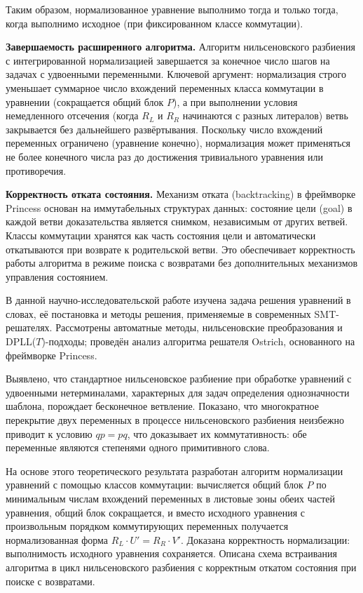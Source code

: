 \documentclass[14pt, russian]{scrartcl}
\begin{document}
Таким образом, нормализованное уравнение выполнимо тогда и только тогда, когда
выполнимо исходное (при фиксированном классе коммутации).

\medskip\noindent\textbf{Завершаемость расширенного алгоритма.}
Алгоритм нильсеновского разбиения с интегрированной нормализацией завершается
за конечное число шагов на задачах с удвоенными переменными. Ключевой аргумент:
нормализация строго уменьшает суммарное число вхождений переменных класса
коммутации в уравнении (сокращается общий блок $P$), а при выполнении условия
немедленного отсечения (когда $R_L$ и $R_R$ начинаются с разных литералов)
ветвь закрывается без дальнейшего развёртывания. Поскольку число вхождений
переменных ограничено (уравнение конечно), нормализация может применяться
не более конечного числа раз до достижения тривиального уравнения или
противоречия.

\medskip\noindent\textbf{Корректность отката состояния.}
Механизм отката (backtracking) в фреймворке Princess основан на иммутабельных
структурах данных: состояние цели (goal) в каждой ветви доказательства
является снимком, независимым от других ветвей. Классы коммутации хранятся
как часть состояния цели и автоматически откатываются при возврате к родительской
ветви. Это обеспечивает корректность работы алгоритма в режиме поиска с
возвратами без дополнительных механизмов управления состоянием.


В данной научно-исследовательской работе изучена задача решения уравнений
в словах, её постановка и методы решения, применяемые в современных SMT-решателях.
Рассмотрены автоматные методы, нильсеновские преобразования и DPLL($T$)-подходы;
проведён анализ алгоритма решателя Ostrich, основанного на фреймворке Princess.

Выявлено, что стандартное нильсеновское разбиение при обработке уравнений с
удвоенными нетерминалами, характерных для задач определения однозначности шаблона,
порождает бесконечное ветвление. Показано, что многократное перекрытие двух
переменных в процессе нильсеновского разбиения неизбежно приводит к условию
$qp = pq$, что доказывает их коммутативность: обе переменные являются степенями
одного примитивного слова.

На основе этого теоретического результата разработан алгоритм нормализации
уравнений с помощью классов коммутации: вычисляется общий блок $P$ по минимальным
числам вхождений переменных в листовые зоны обеих частей уравнения, общий блок
сокращается, и вместо исходного уравнения с произвольным порядком коммутирующих
переменных получается нормализованная форма $R_L \cdot U' = R_R \cdot V'$.
Доказана корректность нормализации: выполнимость исходного уравнения сохраняется.
Описана схема встраивания алгоритма в цикл нильсеновского разбиения с корректным
откатом состояния при поиске с возвратами.
\end{document}
